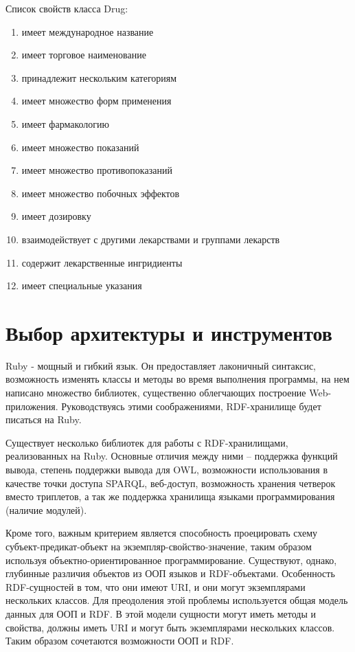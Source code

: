 \documentclass[specialist,subf,href,colorlinks=true
]{disser}
\begin{document}
Список свойств класса Drug:
\begin{enumerate}
 \item имеет международное название
 \item имеет торговое наименование
 \item принадлежит нескольким категориям
 \item имеет множество форм применения
 \item имеет фармакологию
 \item имеет множество показаний
 \item имеет множество противопоказаний
 \item имеет множество побочных эффектов
 \item имеет дозировку
 \item взаимодействует с другими лекарствами и группами лекарств
 \item содержит лекарственные ингридиенты
 \item имеет специальные указания
\end{enumerate}

\section{Выбор архитектуры и инструментов}

Ruby - мощный и гибкий язык. Он предоставляет лаконичный синтаксис, возможность изменять классы и методы во время выполнения программы, на нем написано множество библиотек, существенно облегчающих построение Web-приложения. Руководствуясь этими соображениями, RDF-хранилище будет писаться на Ruby.

Существует несколько библиотек для работы с RDF-хранилищами, реализованных на Ruby. Основные отличия между ними – поддержка функций вывода, степень поддержки вывода для OWL, возможности использования в качестве точки доступа SPARQL, веб-доступ, возможность хранения четверок вместо триплетов, а так же поддержка хранилища языками программирования (наличие модулей).

Кроме того, важным критерием является способность проецировать схему субъект-предикат-объект на экземпляр-свойство-значение, таким образом используя объектно-ориентированное программирование. Существуют, однако, глубинные различия объектов из ООП языков и RDF-объектами. Особенность RDF-сущностей в том, что они имеют URI, и они могут экземплярами нескольких классов. Для преодоления этой проблемы используется общая модель данных для ООП и RDF. В этой модели сущности могут иметь методы и свойства, должны иметь URI и могут быть экземплярами нескольких классов. Таким образом сочетаются возможности ООП и RDF.
\end{document}
